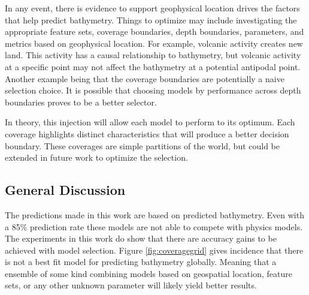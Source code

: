 
\par
In any event, there is evidence to support geophysical location drives the factors that help predict bathymetry.
Things to optimize may include investigating the appropriate feature sets, coverage boundaries, depth boundaries, parameters, and metrics based on geophysical location.
For example, volcanic activity creates new land.
This activity has a causal relationship to bathymetry, but volcanic activity at a specific point may not affect the bathymetry at a potential antipodal point.
Another example being that the coverage boundaries are potentially a naive selection choice.
It is possible that choosing models by performance across depth boundaries proves to be a better selector.
\par
In theory, this injection will allow each model to perform to its optimum.
Each coverage highlights distinct characteristics that will produce a better decision boundary.
These coverages are simple partitions of the world, but could be extended in future work to optimize the selection.




\subsection{General Discussion}
The predictions made in this work are based on predicted bathymetry.
Even with a 85\% prediction rate these models are not able to compete with physics models.
The experiments in this work do show that there are accuracy gains to be achieved with model selection.
Figure \ref{fig:coveragegrid} gives incidence that there is not a best fit model for predicting bathymetry globally.
Meaning that a ensemble of some kind combining models based on geospatial location, feature sets, or any other unknown parameter will likely yield better results.

